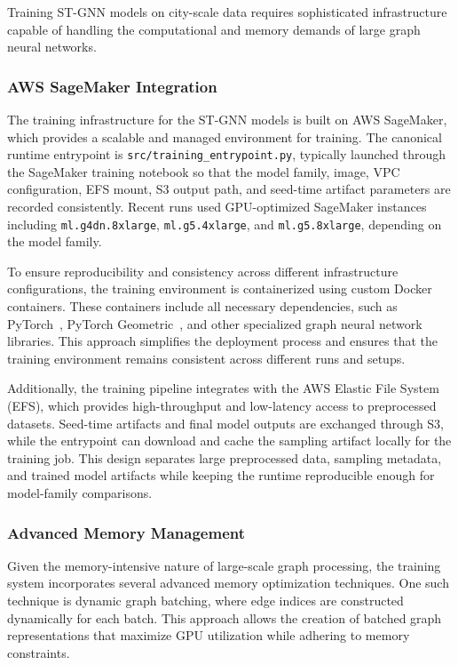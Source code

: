 \documentclass[11pt, a4paper]{article}
\begin{document}
Training ST-GNN models on city-scale data requires sophisticated infrastructure capable of handling the computational and memory demands of large graph neural networks.

\subsubsection{AWS SageMaker Integration}
The training infrastructure for the ST-GNN models is built on AWS SageMaker, which provides a scalable and managed environment for training. The canonical runtime entrypoint is \texttt{src/training\_entrypoint.py}, typically launched through the SageMaker training notebook so that the model family, image, VPC configuration, EFS mount, S3 output path, and seed-time artifact parameters are recorded consistently. Recent runs used GPU-optimized SageMaker instances including \texttt{ml.g4dn.8xlarge}, \texttt{ml.g5.4xlarge}, and \texttt{ml.g5.8xlarge}, depending on the model family.

To ensure reproducibility and consistency across different infrastructure configurations, the training environment is containerized using custom Docker containers. These containers include all necessary dependencies, such as PyTorch~\cite{paszke2019pytorch}, PyTorch Geometric~\cite{fey2019fast}, and other specialized graph neural network libraries. This approach simplifies the deployment process and ensures that the training environment remains consistent across different runs and setups.

Additionally, the training pipeline integrates with the AWS Elastic File System (EFS), which provides high-throughput and low-latency access to preprocessed datasets. Seed-time artifacts and final model outputs are exchanged through S3, while the entrypoint can download and cache the sampling artifact locally for the training job. This design separates large preprocessed data, sampling metadata, and trained model artifacts while keeping the runtime reproducible enough for model-family comparisons.

\subsubsection{Advanced Memory Management}
Given the memory-intensive nature of large-scale graph processing, the training system incorporates several advanced memory optimization techniques. One such technique is dynamic graph batching, where edge indices are constructed dynamically for each batch. This approach allows the creation of batched graph representations that maximize GPU utilization while adhering to memory constraints.
\end{document}
